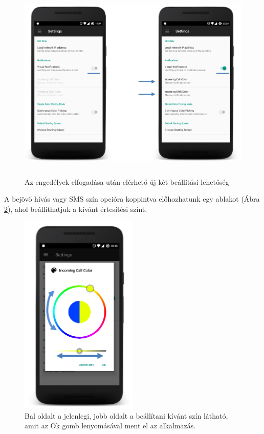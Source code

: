 \documentclass[../main.tex]{subfiles}
\begin{document}
                \begin{figure}[!h]
                    \includegraphics[height=9.5cm]{android_res/screen_pictures/visual_notification_01.png}
                    \caption{Az engedélyek elfogadása után elérhető új két beállítási lehetőség}
                     \label{fig:vis_not_01}
                \end{figure}
                
                A bejövő hívás vagy SMS szín opcióra koppintva előhozhatunk egy ablakot (Ábra \ref{fig:vis_not_03}), ahol beállíthatjuk a kívánt értesítési színt. 
                
                \begin{figure}[!h]
                    \includegraphics[width=5.6cm]{android_res/screen_pictures/visual_notification_03.png}
                    \caption{Bal oldalt a jelenlegi, jobb oldalt a beállítani kívánt szín látható, amit az Ok gomb lenyomásával ment el az alkalmazás.}
                    \label{fig:vis_not_03}
                \end{figure}
            
\end{document}
